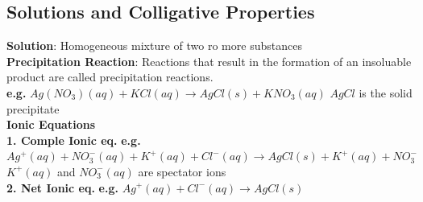 \subsection{Solutions and Colligative Properties}
\textbf{Solution}: Homogeneous mixture of two ro more substances \hspace{3pt}
\\

\textbf{Precipitation Reaction}: Reactions that result in the formation of an insoluable product are called precipitation reactions.\\
\textbf{e.g.} $Ag(NO_3)(aq) + KCl(aq) \longrightarrow AgCl(s) + KNO_3 (aq)$ \hspace{3pt} $AgCl$ is the solid precipitate\\

\textbf{Ionic Equations}\\
\textbf{1. Comple Ionic eq.} \textbf{e.g.}$Ag^{+}(aq) + NO_3^{-}(aq) + K^{+}(aq) + Cl^{-}(aq) \longrightarrow AgCl(s) + K^{+}(aq) + NO_3^{-}$\\
$K^{+}(aq)$ and $NO_3^{-}(aq)$ are spectator ions\\
\textbf{2. Net Ionic eq.} \textbf{e.g.} $Ag^{+}(aq) + Cl^{-}(aq) \longrightarrow AgCl(s)$

